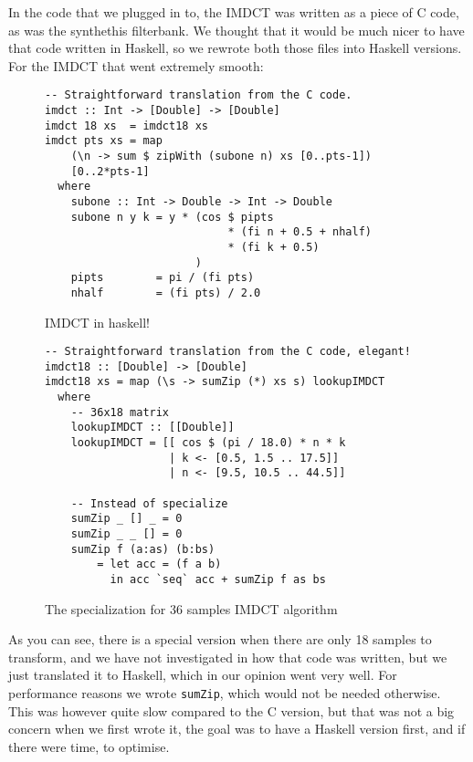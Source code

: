 \documentclass[a4paper,12pt]{article}
\begin{document}
        In the code that we plugged in to, the IMDCT was written as a piece of C
        code, as was the synthethis filterbank. We thought that it would be much
        nicer to have that code written in Haskell, so we rewrote both those
        files into Haskell versions. For the IMDCT that went extremely
        smooth:
\begin{figure}[h]
  \begin{center}
        \begin{lstlisting}
-- Straightforward translation from the C code.
imdct :: Int -> [Double] -> [Double]
imdct 18 xs  = imdct18 xs
imdct pts xs = map
    (\n -> sum $ zipWith (subone n) xs [0..pts-1])
    [0..2*pts-1]
  where
    subone :: Int -> Double -> Int -> Double
    subone n y k = y * (cos $ pipts
                            * (fi n + 0.5 + nhalf)
                            * (fi k + 0.5)
                       )
    pipts        = pi / (fi pts)
    nhalf        = (fi pts) / 2.0
        \end{lstlisting}
    \caption{IMDCT in haskell!}\label{fig:imdcthaskell}
  \end{center}
\end{figure}

\begin{figure}[h]
  \begin{center}
        \begin{lstlisting}
-- Straightforward translation from the C code, elegant!
imdct18 :: [Double] -> [Double]
imdct18 xs = map (\s -> sumZip (*) xs s) lookupIMDCT
  where
    -- 36x18 matrix
    lookupIMDCT :: [[Double]]
    lookupIMDCT = [[ cos $ (pi / 18.0) * n * k
                   | k <- [0.5, 1.5 .. 17.5]]
                   | n <- [9.5, 10.5 .. 44.5]]

    -- Instead of specialize
    sumZip _ [] _ = 0
    sumZip _ _ [] = 0
    sumZip f (a:as) (b:bs)
        = let acc = (f a b)
          in acc `seq` acc + sumZip f as bs
        \end{lstlisting}
    \caption{The specialization for 36 samples IMDCT algorithm}\label{fig:imdctimpl36}
  \end{center}
\end{figure}

        As you can see, there is a special version when there are only 18
        samples to transform, and we have not investigated in how that code was
        written, but we just translated it to Haskell, which in our opinion went
        very well. For performance reasons we wrote \texttt{sumZip}, which would
        not be needed otherwise. This was however quite slow compared to the C
        version, but that was not a big concern when we first wrote it, the goal
        was to have a Haskell version first, and if there were time, to
        optimise. \\
\end{document}

